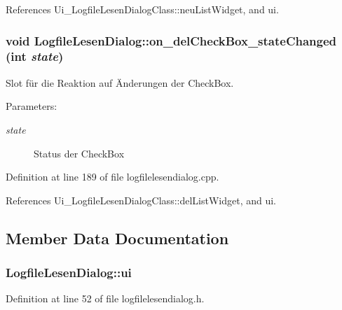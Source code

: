 References Ui\_\-LogfileLesenDialogClass::neuListWidget, and ui.\hypertarget{class_logfile_lesen_dialog_bb303eb1d6f62d71c020c155de3e2f96}{
\subsubsection[on\_\-delCheckBox\_\-stateChanged]{\setlength{\rightskip}{0pt plus 5cm}void LogfileLesenDialog::on\_\-delCheckBox\_\-stateChanged (int {\em state})}}
\label{class_logfile_lesen_dialog_bb303eb1d6f62d71c020c155de3e2f96}


Slot für die Reaktion auf Änderungen der CheckBox. 

\begin{Desc}
\item[Parameters:]
\begin{description}
\item[{\em state}]Status der CheckBox \end{description}
\end{Desc}


Definition at line 189 of file logfilelesendialog.cpp.

References Ui\_\-LogfileLesenDialogClass::delListWidget, and ui.

\subsection{Member Data Documentation}
\hypertarget{class_logfile_lesen_dialog_ae3b0fc39f6af7f8fcb4b84920cacaea}{
\subsubsection[ui]{ {\bf LogfileLesenDialog::ui}}}
\label{class_logfile_lesen_dialog_ae3b0fc39f6af7f8fcb4b84920cacaea}




Definition at line 52 of file logfilelesendialog.h.

